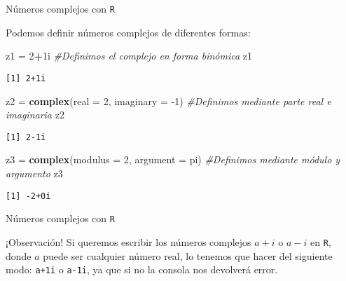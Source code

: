 \documentclass[
  ignorenonframetext,
]{beamer}
\newenvironment{Shaded}{\begin{snugshade}}{\end{snugshade}}
\newcommand{\CommentTok}[1]{\textcolor[rgb]{0.56,0.35,0.01}{\textit{#1}}}
\newcommand{\DataTypeTok}[1]{\textcolor[rgb]{0.13,0.29,0.53}{#1}}
\newcommand{\DecValTok}[1]{\textcolor[rgb]{0.00,0.00,0.81}{#1}}
\newcommand{\KeywordTok}[1]{\textcolor[rgb]{0.13,0.29,0.53}{\textbf{#1}}}
\newcommand{\NormalTok}[1]{#1}
\newcommand{\OperatorTok}[1]{\textcolor[rgb]{0.81,0.36,0.00}{\textbf{#1}}}
\newcommand{\StringTok}[1]{\textcolor[rgb]{0.31,0.60,0.02}{#1}}
\begin{document}
\begin{frame}[fragile]{Números complejos con \texttt{R}}
\protect\hypertarget{nuxfameros-complejos-con-r-1}{}

Podemos definir números complejos de diferentes formas:

\begin{Shaded}
\begin{Highlighting}[]
\NormalTok{z1 =}\StringTok{ }\DecValTok{2}\OperatorTok{+}\NormalTok{1i }\CommentTok{#Definimos el complejo en forma binómica}
\NormalTok{z1}
\end{Highlighting}
\end{Shaded}

\begin{verbatim}
[1] 2+1i
\end{verbatim}

\begin{Shaded}
\begin{Highlighting}[]
\NormalTok{z2 =}\StringTok{ }\KeywordTok{complex}\NormalTok{(}\DataTypeTok{real =} \DecValTok{2}\NormalTok{, }\DataTypeTok{imaginary =} \DecValTok{-1}\NormalTok{) }\CommentTok{#Definimos mediante parte real e imaginaria}
\NormalTok{z2}
\end{Highlighting}
\end{Shaded}

\begin{verbatim}
[1] 2-1i
\end{verbatim}

\begin{Shaded}
\begin{Highlighting}[]
\NormalTok{z3 =}\StringTok{ }\KeywordTok{complex}\NormalTok{(}\DataTypeTok{modulus =} \DecValTok{2}\NormalTok{, }\DataTypeTok{argument =}\NormalTok{ pi) }\CommentTok{#Definimos mediante módulo y argumento}
\NormalTok{z3}
\end{Highlighting}
\end{Shaded}

\begin{verbatim}
[1] -2+0i
\end{verbatim}

\end{frame}

\begin{frame}[fragile]{Números complejos con \texttt{R}}
\protect\hypertarget{nuxfameros-complejos-con-r-2}{}

¡Observación! Si queremos escribir los números complejos \(a+i\) o
\(a-i\) en \texttt{R}, donde \(a\) puede ser cualquier número real, lo
tenemos que hacer del siguiente modo: \texttt{a+1i} o \texttt{a-1i}, ya
que si no la consola nos devolverá error.

\end{frame}
\end{document}
